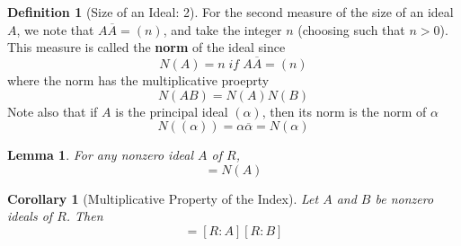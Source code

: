 \documentclass[12pt]{article}
\newtheorem{lem}[thm]{Lemma}  %
\newtheorem{cor}[thm]{Corollary}
\theoremstyle{definition}
\newtheorem{defn}[thm]{Definition}
\theoremstyle{remark}
\numberwithin{equation}{section}
\newcommand\B[1]{\textbf{ #1}}
\begin{document}
\vspace{15pt}

\begin{defn}[Size of an Ideal: 2]
        For the second measure of the size of an ideal $A$, we note that $A\overline{A} = (n)$, and take the integer $n$ (choosing such that $n > 0$). This measure is called the \B{norm} of the ideal since \begin{equation}
                N(A) = n\;if\;A\overline{A} = (n)
        \end{equation}
        where the norm has the multiplicative proeprty \begin{equation}
                N(AB) = N(A)N(B)
        \end{equation}
        Note also that if $A$ is the principal ideal $(\alpha)$, then its norm is the norm of $\alpha$ \begin{equation}
                N((\alpha)) = \alpha\overline{\alpha} = N(\alpha)
        \end{equation}
\end{defn}

\vspace{15pt}

\begin{lem}
        For any nonzero ideal $A$ of $R$, \begin{equation}
                [R:A] = N(A)
        \end{equation}
\end{lem}

\vspace{15pt}

\begin{cor}[Multiplicative Property of the Index]
        Let $A$ and $B$ be nonzero ideals of $R$. Then \begin{equation}
                [R:AB] = [R:A][R:B]
        \end{equation}
\end{cor}

\vspace{15pt}
\end{document}
